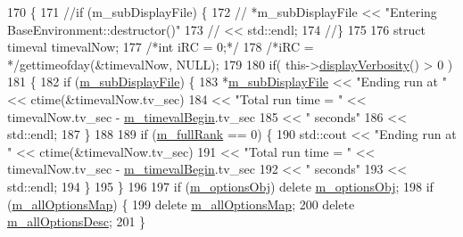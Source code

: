\begin{DoxyCode}
170 \{
171   \textcolor{comment}{//if (m\_subDisplayFile) \{}
172   \textcolor{comment}{//  *m\_subDisplayFile << "Entering BaseEnvironment::destructor()"}
173   \textcolor{comment}{//                          << std::endl;}
174   \textcolor{comment}{//\}}
175 
176   \textcolor{keyword}{struct }timeval timevalNow;
177   \textcolor{comment}{/*int iRC = 0;*/}
178   \textcolor{comment}{/*iRC = */}gettimeofday(&timevalNow, NULL);
179 
180   \textcolor{keywordflow}{if}( this->\hyperlink{class_q_u_e_s_o_1_1_base_environment_a1fe5f244fc0316a0ab3e37463f108b96}{displayVerbosity}() > 0 )
181     \{
182      \textcolor{keywordflow}{if} (\hyperlink{class_q_u_e_s_o_1_1_base_environment_a52b4275aa8ee85994dd304d9fe95c9c5}{m\_subDisplayFile}) \{
183         *\hyperlink{class_q_u_e_s_o_1_1_base_environment_a52b4275aa8ee85994dd304d9fe95c9c5}{m\_subDisplayFile} << \textcolor{stringliteral}{"Ending run at "}    << ctime(&timevalNow.tv\_sec)
184                           << \textcolor{stringliteral}{"Total run time = "} << timevalNow.tv\_sec - 
      \hyperlink{class_q_u_e_s_o_1_1_base_environment_a7b2842a4eb78bcae522cf4f9a5634279}{m\_timevalBegin}.tv\_sec
185                           << \textcolor{stringliteral}{" seconds"}
186                           << std::endl;
187       \}
188 
189     \textcolor{keywordflow}{if} (\hyperlink{class_q_u_e_s_o_1_1_base_environment_a0bfa53f6bdaec0a6aa3dc00ee2c0101f}{m\_fullRank} == 0) \{
190         std::cout << \textcolor{stringliteral}{"Ending run at "}    << ctime(&timevalNow.tv\_sec)
191                   << \textcolor{stringliteral}{"Total run time = "} << timevalNow.tv\_sec - \hyperlink{class_q_u_e_s_o_1_1_base_environment_a7b2842a4eb78bcae522cf4f9a5634279}{m\_timevalBegin}.tv\_sec
192                   << \textcolor{stringliteral}{" seconds"}
193                   << std::endl;
194       \}
195     \}
196 
197   \textcolor{keywordflow}{if} (\hyperlink{class_q_u_e_s_o_1_1_base_environment_aa91c7ac0ab11472bafb0ae4ac36d2194}{m\_optionsObj}) \textcolor{keyword}{delete} \hyperlink{class_q_u_e_s_o_1_1_base_environment_aa91c7ac0ab11472bafb0ae4ac36d2194}{m\_optionsObj};
198   \textcolor{keywordflow}{if} (\hyperlink{class_q_u_e_s_o_1_1_base_environment_a2d8e668313b18f57e4607c3bec1ecda2}{m\_allOptionsMap}) \{
199     \textcolor{keyword}{delete} \hyperlink{class_q_u_e_s_o_1_1_base_environment_a2d8e668313b18f57e4607c3bec1ecda2}{m\_allOptionsMap};
200     \textcolor{keyword}{delete} \hyperlink{class_q_u_e_s_o_1_1_base_environment_aac5465b02be108536bda1b5627456c97}{m\_allOptionsDesc};
201   \}

\end{DoxyCode}
